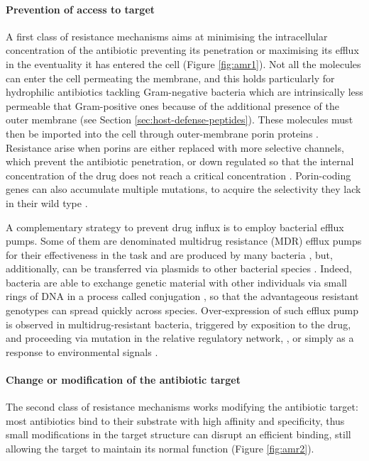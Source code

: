 \paragraph{Prevention of access to target}
A first class of resistance mechanisms aims at minimising the intracellular concentration of the antibiotic preventing its penetration or maximising its efflux in the eventuality it has entered the cell (Figure \ref{fig:amr1}).
%
Not all the molecules can enter the cell permeating the membrane, and this holds particularly for hydrophilic antibiotics tackling Gram-negative bacteria which are intrinsically less permeable that Gram-positive ones because of the additional presence of the outer membrane \citep{Delcour2009} (see Section \ref{sec:host-defense-peptides}).
%
These molecules must then be imported into the cell through outer-membrane porin proteins \citep{Vargiu2012,Kojima2013}. Resistance arise when porins are either replaced with more selective channels, which prevent the antibiotic penetration, or down regulated so that the internal concentration of the drug does not reach a critical concentration \citep{Lavigne2013}. Porin-coding genes can also accumulate multiple mutations, to acquire the selectivity they lack in their wild type \citep{Poulou2013}.

A complementary strategy to prevent drug influx is to employ bacterial efflux pumps. Some of them are denominated multidrug resistance (MDR) efflux pumps for their effectiveness in the task and are produced by many bacteria \citep{Floyd2010,Ogawa2012}, but, additionally, can be transferred via plasmids to other bacterial species \citep{Dolejska2013}. Indeed, bacteria are able to exchange genetic material with other individuals via small rings of DNA in a process called conjugation \citep{Sorensen2005}, so that the advantageous resistant genotypes can spread quickly across species.
%
Over-expression of such efflux pump is observed in multidrug-resistant bacteria, triggered by exposition to the drug, and proceeding via mutation in the relative regulatory network, \citep{Abouzeed2008}, or simply as a response to environmental signals \citep{Nikaido2011}.


\paragraph{Change or modification of the antibiotic target}
The second class of resistance mechanisms works modifying the antibiotic target: most antibiotics bind to their substrate with high affinity and specificity, thus small modifications in the target structure can disrupt an efficient binding, still allowing the target to maintain its normal function (Figure \ref{fig:amr2}).

